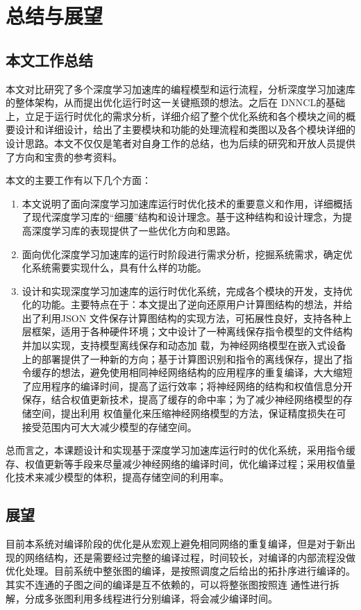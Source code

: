 
\chapter{总结与展望}

\section{本文工作总结}
本文对比研究了多个深度学习加速库的编程模型和运行流程，分析深度学习加速库的整体架构，从而提出优化运行时这一关键瓶颈的想法。之后在 DNNCL的基础上，立足于运行时优化的需求分析，详细介绍了整个优化系统和各个模块之间的概要设计和详细设计，给出了主要模块和功能的处理流程和类图以及各个模块详细的设计思路。本文不仅仅是笔者对自身工作的总结，也为后续的研究和开放人员提供了方向和宝贵的参考资料。

本文的主要工作有以下几个方面：
\begin{enumerate}
    \item 本文说明了面向深度学习加速库运行时优化技术的重要意义和作用，详细概括了现代深度学习库的“细腰”结构和设计理念。基于这种结构和设计理念，为提高深度学习库的表现提供了一些优化方向和思路。
    \item 面向优化深度学习加速库的运行时阶段进行需求分析，挖掘系统需求，确定优化系统需要实现什么，具有什么样的功能。
    \item 设计和实现深度学习加速库的运行时优化系统，完成各个模块的开发，支持优化的功能。主要特点在于：本文提出了逆向还原用户计算图结构的想法，并给出了利用JSON 文件保存计算图结构的实现方法，可拓展性良好，支持各种上层框架，适用于各种硬件环境；文中设计了一种离线保存指令模型的文件结构并加以实现，支持模型离线保存和动态加    载，为神经网络模型在嵌入式设备上的部署提供了一种新的方向；基于计算图识别和指令的离线保存，提出了指令缓存的想法，避免使用相同神经网络结构的应用程序的重复编译，大大缩短了应用程序的编译时间，提高了运行效率；将神经网络的结构和权值信息分开保存，结合权值更新技术，提高了缓存的命中率；为了减少神经网络模型的存储空间，提出利用   权值量化来压缩神经网络模型的方法，保证精度损失在可接受范围内可大大减少模型的存储空间。
\end{enumerate}

总而言之，本课题设计和实现基于深度学习加速库运行时的优化系统，采用指令缓存、权值更新等手段来尽量减少神经网络的编译时间，优化编译过程；采用权值量化技术来减少模型的体积，提高存储空间的利用率。

\section{展望}
目前本系统对编译阶段的优化是从宏观上避免相同网络的重复编译，但是对于新出现的网络结构，还是需要经过完整的编译过程，时间较长，对编译的内部流程没做优化处理。目前系统中整张图的编译，是按照调度之后给出的拓扑序进行编译的。其实不连通的子图之间的编译是互不依赖的，可以将整张图按照连
通性进行拆解，分成多张图利用多线程进行分别编译，将会减少编译时间。

